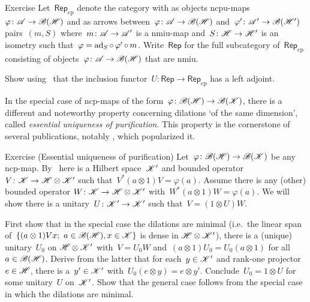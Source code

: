 \documentclass[b]{subfiles}
\begin{document}
\begin{parsec}
\begin{point}{Exercise}
    Let~$\mathsf{Rep}_{\mathrm{cp}}$
        denote the category with as objects
            ncpu-maps~$\varphi\colon \mathscr{A} \to \mathscr{B}(\mathscr{H})$
            and as arrows between~$\varphi\colon \mathscr{A} \to \mathscr{B}(\mathscr{H})$
            and~$\varphi'\colon \mathscr{A}' \to \mathscr{B}(\mathscr{H}')$
            pairs~$(m, S)$
            where~$m\colon \mathscr{A} \to \mathscr{A}'$ is a nmiu-map
            and~$S\colon \mathscr{H} \to \mathscr{H}'$ is an isometry
            such that~$\varphi = \mathrm{ad}_S \mathop{\circ} \varphi' \mathop{\circ} m$.
    Write~$\mathsf{Rep}$
        for the full subcategory of~$\mathsf{Rep}_{\mathrm{cp}}$
        consisting of objects~$\varphi\colon \mathscr{A} \to \mathscr{B}(\mathscr{H})$
            that are nmiu.

Show using~
    that the inclusion functor~$U \colon \mathsf{Rep}
    \to \mathsf{Rep}_{\mathrm{cp}}$ has a left adjoint.
\par %
\begin{point}%
In the special case of ncp-maps
    of the form~$\varphi \colon \mathscr{B}(\mathscr{H}) \to \mathscr{B}(\mathscr{K})$,
    there is a different and noteworthy  property
    concerning dilations `of the same dimension',
    called \emph{essential uniqueness of purification}.
This property is the cornerstone of several publications,
    notably \cite{chiribella}, which popularized it.
\par %
\end{point}
\end{point}
\begin{point}{Exercise (Essential uniqueness of purification)}
    Let~$\varphi \colon \mathscr{B}(\mathscr{H}) \to \mathscr{B}(\mathscr{K})$
        be any ncp-map.
    By~
    here is a Hilbert space~$\mathscr{K}'$
        and bounded operator~$V\colon \mathscr{K} \to \mathscr{H} \otimes \mathscr{K}'$
        such that~$V^* (a\otimes 1) V = \varphi(a)$.
        Assume there is any (other) bounded operator
        $W\colon \mathscr{K} \to \mathscr{H} \otimes \mathscr{K}'$
        with~$W^* (a \otimes 1) W = \varphi(a)$.
    We will show there is a unitary~$U \colon \mathscr{K}' \to \mathscr{K}'$
    such that~$V = (1 \otimes U) W$.

    First show that in the special case the dilations are minimal
    (i.e.~the linear span of~$\{(a \otimes 1) V x;\  a \in \mathscr{B}(\mathscr{H}), x \in \mathscr{K}\}$ is dense
            in $\mathscr{H} \otimes \mathscr{K}'$),
        there is a (unique) unitary~$U_0$ on $\mathscr{H} \otimes \mathscr{K}'$
        with~$V = U_0 W$ and~$(a \otimes 1) U_0 = U_0 (a \otimes 1)$
            for all~$a \in \mathscr{B}(\mathscr{H})$.
    Derive from the latter
    that for each~$y \in \mathscr{K}'$ and rank-one projector~$e \in \mathscr{H}$,
        there is a~$y' \in \mathscr{K}'$
        with~$U_0 (e \otimes y) = e \otimes y'$.
    Conclude~$U_0 = 1 \otimes U$ for some unitary~$U$ on~$\mathscr{K}'$.
    Show  that the general case follows from the special case
        in which the dilations are minimal.
\end{point}
\end{parsec}
\end{document}
